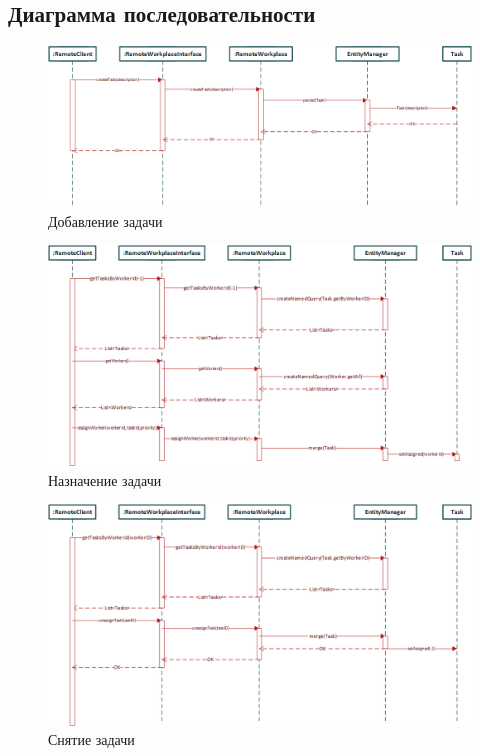 \subsection{Диаграмма последовательности}
\begin{figure}[H]
	\centering
	\includegraphics[width=1\textwidth]{../materials/SeqAdd.png}
	\caption{Добавление задачи}
	\label{fig:SeqAdd}
\end{figure}

\begin{figure}[H]
	\centering
	\includegraphics[width=1\textwidth]{../materials/SeqAssign.png}
	\caption{Назначение задачи}
	\label{fig:SeqAssign}
\end{figure}

\begin{figure}[H]
\centering
\includegraphics[width=1\textwidth]{../materials/SeqUnassign.png}
\caption{Снятие задачи}
\label{fig:SeqUnassign}
\end{figure}

